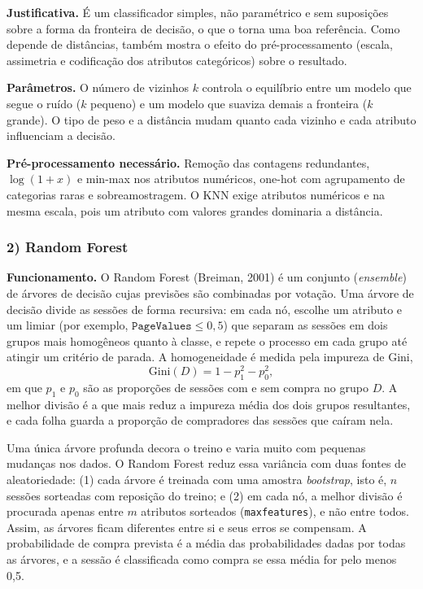 \documentclass[11pt,a4paper]{article}
\DeclareRobustCommand{\atr}[1]{{\renewcommand{\_}{\textunderscore\allowbreak}\texttt{#1}}}
\begin{document}
\textbf{Justificativa.} É um classificador simples, não paramétrico e sem suposições sobre a forma da fronteira de
decisão, o que o torna uma boa referência. Como depende de distâncias, também mostra o efeito do pré-processamento
(escala, assimetria e codificação dos atributos categóricos) sobre o resultado.

\textbf{Parâmetros.} O número de vizinhos $k$ controla o equilíbrio entre um modelo que segue o ruído ($k$ pequeno) e
um modelo que suaviza demais a fronteira ($k$ grande). O tipo de peso e a distância mudam quanto cada vizinho e cada
atributo influenciam a decisão.

\textbf{Pré-processamento necessário.} Remoção das contagens redundantes, $\log(1+x)$ e min-max nos atributos
numéricos, one-hot com agrupamento de categorias raras e sobreamostragem. O KNN exige atributos numéricos e na mesma
escala, pois um atributo com valores grandes dominaria a distância.

\subsubsection*{2) Random Forest }

\textbf{Funcionamento.} O Random Forest (Breiman, 2001) é um conjunto (\textit{ensemble}) de árvores de decisão cujas
previsões são combinadas por votação. Uma árvore de decisão divide as sessões de forma recursiva: em cada nó, escolhe
um atributo e um limiar (por exemplo, $\texttt{PageValues} \le 0{,}5$) que separam as sessões em dois grupos mais
homogêneos quanto à classe, e repete o processo em cada grupo até atingir um critério de parada. A homogeneidade é
medida pela impureza de Gini,
\begin{equation*}
  \mathrm{Gini}(D) = 1 - p_1^2 - p_0^2,
\end{equation*}
em que $p_1$ e $p_0$ são as proporções de sessões com e sem compra no grupo $D$. A melhor divisão é a que mais reduz
a impureza média dos dois grupos resultantes, e cada folha guarda a proporção de compradores das sessões que caíram
nela.

Uma única árvore profunda decora o treino e varia muito com pequenas mudanças nos dados. O Random Forest reduz essa
variância com duas fontes de aleatoriedade: (1) cada árvore é treinada com uma amostra \textit{bootstrap}, isto é,
$n$ sessões sorteadas com reposição do treino; e (2) em cada nó, a melhor divisão é procurada apenas entre $m$
atributos sorteados (\atr{max\_features}), e não entre todos. Assim, as árvores ficam diferentes entre si e seus erros
se compensam. A probabilidade de compra prevista é a média das probabilidades dadas por todas as árvores, e a sessão é
classificada como compra se essa média for pelo menos 0,5.
\end{document}
